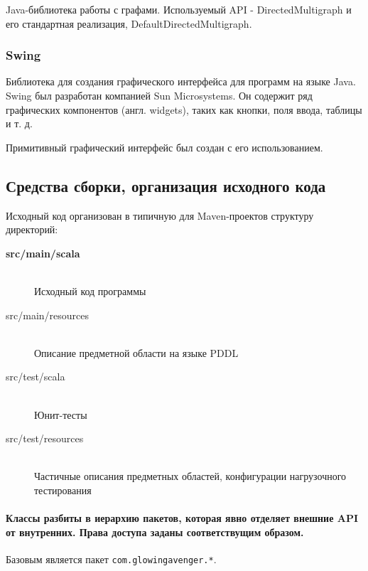 Java-библиотека работы с графами. Используемый API - DirectedMultigraph и его стандартная реализация, DefaultDirectedMultigraph.

\subsubsection{Swing}

Библиотека для создания графического интерфейса для программ
на языке Java. Swing был разработан компанией Sun Microsystems. Он
содержит ряд графических компонентов (англ. widgets), таких как кнопки,
поля ввода, таблицы и т. д.

Примитивный графический интерфейс был создан с его использованием.

\subsection{Средства сборки, организация исходного кода}

Исходный код организован в типичную для Maven-проектов структуру директорий:

\begin{description}
 \item[\textbf{src/main/scala}]\hfill \\
 Исходный код программы 
 \item[src/main/resources]\hfill \\
 Описание предметной области на языке PDDL
 \item[src/test/scala]\hfill \\
 Юнит-тесты
 \item[src/test/resources]\hfill \\
 Частичные описания предметных областей, конфигурации нагрузочного тестирования
\end{description}

\paragraph{Классы разбиты в иерархию пакетов, которая явно отделяет внешние API от внутренних. Права доступа заданы соответствущим образом.}

Базовым является пакет \lstinline{com.glowingavenger.*}.

